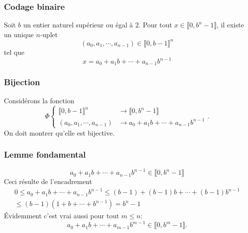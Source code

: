 



\begin{frame}
 \frametitle{Codage binaire}
Soit $b$ un entier naturel supérieur ou égal à $2$.\newline
Pour tout $x \in \llbracket 0 , b^n-1 \rrbracket$, il existe un unique $n$-uplet
\begin{displaymath}
 (a_0,a_1,\cdots,a_{n-1})\in \llbracket 0 , b-1\rrbracket^n
\end{displaymath}
tel que 
\begin{displaymath}
 x = a_0 + a_1 b +\cdots +a_{n-1}b^{n-1}
\end{displaymath}
\end{frame}

\begin{frame}
 \frametitle{Bijection}
Considérons la fonction
\begin{displaymath}
 \Phi\left\lbrace 
\begin{aligned}
\llbracket 0 , b-1\rrbracket^n &\rightarrow \llbracket 0 , b^n-1\rrbracket\\
(a_0,a_1,\cdots,a_{n-1}) &\rightarrow a_0 + a_1 b +\cdots +a_{n-1}b^{n-1} 
\end{aligned}
\right. .
\end{displaymath}
On doit montrer qu'elle est bijective.
\end{frame}

\begin{frame}
 \frametitle{Lemme fondamental}
\begin{displaymath}
 a_0 + a_1 b +\cdots +a_{n-1}b^{n-1}\in \llbracket 0,b^n-1\rrbracket
\end{displaymath}
Ceci résulte de l'encadrement
\begin{multline*}
 0\leq a_0 + a_1 b +\cdots +a_{n-1}b^{n-1} 
\leq (b-1) + (b-1) b +\cdots +(b-1)b^{n-1}\\
\leq (b-1)(1+b+\cdots +b^{n-1})=b^n-1
\end{multline*}
\'Evidemment c'est vrai aussi pour tout $m\leq n$:
\begin{displaymath}
 a_0 + a_1 b +\cdots +a_{m-1}b^{m-1}\in \llbracket 0 , b^m-1\rrbracket.
\end{displaymath} 
\end{frame}

